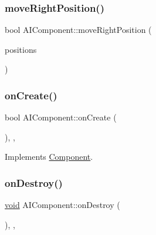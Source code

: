 \mbox{\label{classAIComponent_ac7ae5bfd9cf4e5163a4289c096c78f7c}} 
\subsubsection{\texorpdfstring{move\+Right\+Position()}{moveRightPosition()}}
{\footnotesize\ttfamily bool A\+I\+Component\+::move\+Right\+Position (\begin{DoxyParamCaption}\item[{b2\+Vec2}]{positions }\end{DoxyParamCaption})\hspace{0.3cm}{\ttfamily [inline]}}

\mbox{\label{classAIComponent_a1f7e2f748183cbcba9e3f351025b862c}} 
\subsubsection{\texorpdfstring{on\+Create()}{onCreate()}}
{\footnotesize\ttfamily bool A\+I\+Component\+::on\+Create (\begin{DoxyParamCaption}{ }\end{DoxyParamCaption})\hspace{0.3cm}{\ttfamily [inline]}, {\ttfamily [override]}, {\ttfamily [virtual]}}



Implements \hyperlink{classComponent_a3a1537a8b8bcdb2155afbb925c77b0a2}{Component}.

\mbox{\label{classAIComponent_a82e8e79810024e09695545ebf59452f2}} 
\subsubsection{\texorpdfstring{on\+Destroy()}{onDestroy()}}
{\footnotesize\ttfamily \hyperlink{imgui__impl__opengl3__loader_8h_ac668e7cffd9e2e9cfee428b9b2f34fa7}{void} A\+I\+Component\+::on\+Destroy (\begin{DoxyParamCaption}{ }\end{DoxyParamCaption})\hspace{0.3cm}{\ttfamily [inline]}, {\ttfamily [override]}, {\ttfamily [virtual]}}



